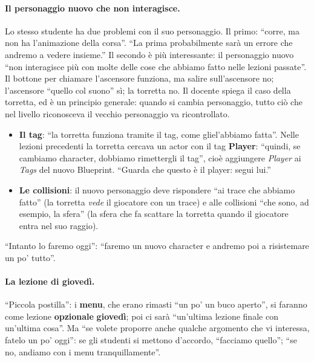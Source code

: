 \paragraph{Il personaggio nuovo che non interagisce.} Lo stesso studente ha due problemi
con il suo personaggio. Il primo: ``corre, ma non ha l'animazione della corsa''. ``La
prima probabilmente sarà un errore che andremo a vedere insieme.'' Il secondo è più
interessante: il personaggio nuovo ``non interagisce più con molte delle cose che
abbiamo fatto nelle lezioni passate''. Il bottone per chiamare l'ascensore funziona, ma
salire sull'ascensore no; l'ascensore ``quello col suono'' sì; la torretta no. Il
docente spiega il caso della torretta, ed è un principio generale: quando si cambia
personaggio, tutto ciò che nel livello riconosceva il vecchio personaggio va
ricontrollato.
\begin{itemize}
  \item \textbf{Il tag}: ``la torretta funziona tramite il tag, come gliel'abbiamo
        fatta''. Nelle lezioni precedenti la torretta cercava un actor con il tag
        \textbf{Player}: ``quindi, se cambiamo character, dobbiamo rimettergli il tag'',
        cioè aggiungere \emph{Player} ai \emph{Tags} del nuovo Blueprint. ``Guarda che
        questo è il player: segui lui.''
  \item \textbf{Le collisioni}: il nuovo personaggio deve rispondere ``ai trace che
        abbiamo fatto'' (la torretta \emph{vede} il giocatore con un trace) e alle
        collisioni ``che sono, ad esempio, la sfera'' (la sfera che fa scattare la
        torretta quando il giocatore entra nel suo raggio).
\end{itemize}
``Intanto lo faremo oggi'': ``faremo un nuovo character e andremo poi a risistemare un po'
tutto''.

\paragraph{La lezione di giovedì.} ``Piccola postilla'': i \textbf{menu}, che erano
rimasti ``un po' un buco aperto'', si faranno come lezione \textbf{opzionale}
\textbf{giovedì}; poi ci sarà ``un'ultima lezione finale con un'ultima cosa''. Ma ``se
volete proporre anche qualche argomento che vi interessa, fatelo un po' oggi'': se gli
studenti si mettono d'accordo, ``facciamo quello''; ``se no, andiamo con i menu
tranquillamente''.

